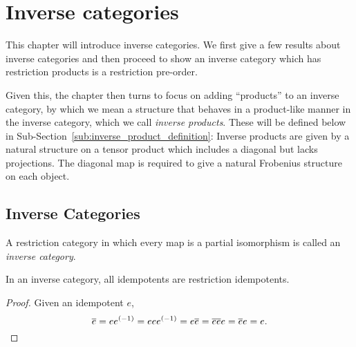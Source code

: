 \chapter{Inverse categories} %
\label{cha:inverse_categories}

This chapter will introduce inverse categories. We first give
a few results about inverse categories and then proceed to show an inverse category which has
restriction products is a restriction pre-order.

Given this, the chapter then turns to focus on adding ``products'' to an inverse category, by which
we mean a structure that behaves in a product-like manner in the inverse category, which we call
\emph{inverse products}. These will be defined below in
Sub-Section~\ref{sub:inverse_product_definition}: Inverse products are given by a natural structure
on a tensor product which includes a diagonal but lacks projections. The diagonal map is required to
give a natural Frobenius structure on each object.

\section{Inverse Categories}
\label{sec:inverse_categories}

\begin{definition}\label{def:inverse_category}
  A restriction category in which every map is a partial
  isomorphism is called an \emph{inverse category}.
\end{definition}

\begin{lemma}
  \label{lem:inverse_idempotents_are_restriction_idempotents}
  In an inverse category, all idempotents are restriction idempotents.
\end{lemma}
\begin{proof}
  Given an idempotent $e$,
  \[
    \overline{e} = e{e}^{(-1)} = e e {e}^{(-1)} = e \overline{e} = \overline{e e} e = \overline{e} e = e.
  \]
\end{proof}


